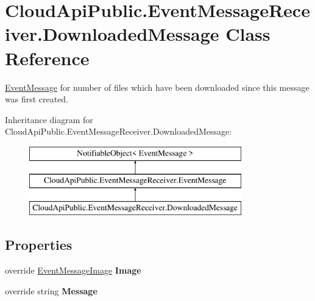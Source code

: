\hypertarget{class_cloud_api_public_1_1_event_message_receiver_1_1_downloaded_message}{\section{Cloud\-Api\-Public.\-Event\-Message\-Receiver.\-Downloaded\-Message Class Reference}
\label{class_cloud_api_public_1_1_event_message_receiver_1_1_downloaded_message}
}


\hyperlink{class_cloud_api_public_1_1_event_message_receiver_1_1_event_message}{Event\-Message} for number of files which have been downloaded since this message was first created.  


Inheritance diagram for Cloud\-Api\-Public.\-Event\-Message\-Receiver.\-Downloaded\-Message\-:\begin{figure}[H]
\begin{center}
\leavevmode
\includegraphics[height=3.000000cm]{class_cloud_api_public_1_1_event_message_receiver_1_1_downloaded_message}
\end{center}
\end{figure}
\subsection*{Properties}
\begin{DoxyCompactItemize}
\item 
\hypertarget{class_cloud_api_public_1_1_event_message_receiver_1_1_downloaded_message_a6ab2a289a72fadfb0b333212fc02e009}{override \hyperlink{namespace_cloud_api_public_1_1_static_aefcc1e7e1c81366ec3f6affd41c1f817}{Event\-Message\-Image} {\bfseries Image}}\label{class_cloud_api_public_1_1_event_message_receiver_1_1_downloaded_message_a6ab2a289a72fadfb0b333212fc02e009}

\item 
\hypertarget{class_cloud_api_public_1_1_event_message_receiver_1_1_downloaded_message_a8b599e5d3794bfb7629357b05e418e2d}{override string {\bfseries Message}}\label{class_cloud_api_public_1_1_event_message_receiver_1_1_downloaded_message_a8b599e5d3794bfb7629357b05e418e2d}

\end{DoxyCompactItemize}
